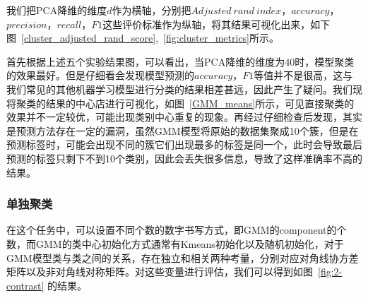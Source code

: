 \documentclass[UTF8]{ctexart}
\begin{document}
我们把PCA降维的维度$d$作为横轴，分别把$Adjusted~rand~index$，$accuracy$，$precision$，$recall$，$F1$这些评价标准作为纵轴，将其结果可视化出来，如下图~\ref{cluster_adjusted_rand_score},~\ref{fig:cluster_metrics}所示。








首先根据上述五个实验结果图，可以看出，当PCA降维的维度为40时，模型聚类的效果最好。但是仔细看会发现模型预测的$accuracy$，$F1$等值并不是很高，这与我们常见的其他机器学习模型进行分类的结果相差甚远，因此产生了疑问。我们现将聚类的结果的中心店进行可视化，如图~\ref{GMM_means}所示，可见直接聚类的效果并不一定较优，可能出现类别中心重复的现象。再经过仔细检查后发现，其实是预测方法存在一定的漏洞，虽然GMM模型将原始的数据集聚成10个簇，但是在预测标签时，可能会出现不同的簇它们出现最多的标签是同一个，此时会导致最后预测的标签只剩下不到10个类别，因此会丢失很多信息，导致了这样准确率不高的结果。

\subsubsection{单独聚类}

在这个任务中，可以设置不同个数的数字书写方式，即GMM的component的个数，而GMM的类中心初始化方式通常有Kmeans初始化以及随机初始化，对于GMM模型类与类之间的关系，存在独立和相关两种考量，分别对应对角线协方差矩阵以及非对角线对称矩阵。对这些变量进行评估，我们可以得到如图~\ref{fig:2-contrast} 的结果。
\end{document}
